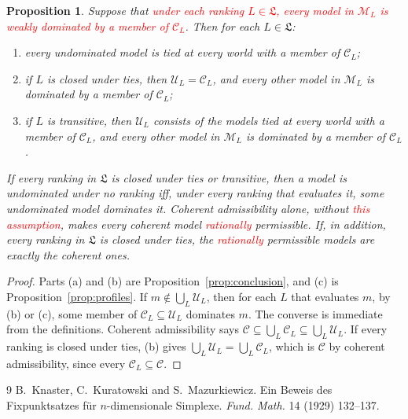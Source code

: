 \documentclass[11pt]{article}
\newtheorem{proposition}[theorem]{Proposition}
\theoremstyle{definition}
\newcommand{\M}{\mathcal M}
\newcommand{\C}{\mathcal C}
\newcommand{\U}{\mathcal U}
\newcommand{\Lf}{\mathfrak L}
\newcommand{\new}[1]{\textcolor{red}{#1}}
\begin{document}
\begin{proposition}\label{prop:permissible}
Suppose that \new{under each ranking $L\in\Lf$, every model in $\M_L$ is weakly dominated by a member of $\C_L$}. Then for each $L\in\Lf$:
\begin{enumerate}[label=(\alph*)]
\item every undominated model is tied at every world with a member of $\C_L$;
\item if $L$ is closed under ties, then $\U_L=\C_L$, and every other model in $\M_L$ is dominated by a member of $\C_L$;
\item if $L$ is transitive, then $\U_L$ consists of the models tied at every world with a member of $\C_L$, and every other model in $\M_L$ is dominated by a member of $\C_L$.
\end{enumerate}
If every ranking in $\Lf$ is closed under ties or transitive, then a model is undominated under no ranking iff, under every ranking that evaluates it, some undominated model dominates it. Coherent admissibility alone, without \new{this assumption}, makes every coherent model \new{rationally} permissible. If, in addition, every ranking in $\Lf$ is closed under ties, the \new{rationally} permissible models are exactly the coherent ones.
\end{proposition}
\begin{proof}
Parts (a) and (b) are Proposition~\ref{prop:conclusion}, and (c) is Proposition~\ref{prop:profiles}. If $m\notin\bigcup_L\U_L$, then for each $L$ that evaluates $m$, by (b) or (c), some member of $\C_L\subseteq\U_L$ dominates $m$. The converse is immediate from the definitions. Coherent admissibility says $\C\subseteq\bigcup_L\C_L\subseteq\bigcup_L\U_L$. If every ranking is closed under ties, (b) gives $\bigcup_L\U_L=\bigcup_L\C_L$, which is $\C$ by coherent admissibility, since every $\C_L\subseteq\C$.
\end{proof}

\begin{thebibliography}{9}
 B.~Knaster, C.~Kuratowski and S.~Mazurkiewicz. Ein Beweis des Fixpunktsatzes f\"ur $n$-dimensionale Simplexe. \emph{Fund. Math.} 14 (1929) 132--137.
\end{thebibliography}
\end{document}
